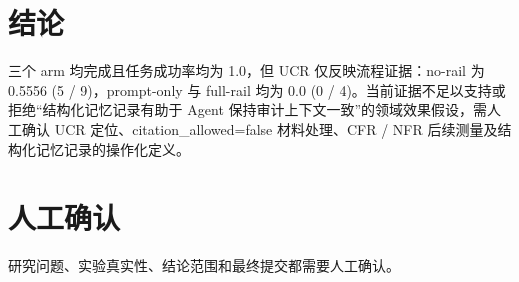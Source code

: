 \documentclass[UTF8]{ctexart}
\begin{document}
\section{结论}
三个 arm 均完成且任务成功率均为 1.0，但 UCR 仅反映流程证据：no-\allowbreak{}rail 为 0.5556 (5 / 9)，prompt-\allowbreak{}only 与 full-\allowbreak{}rail 均为 0.0 (0 / 4)。当前证据不足以支持或拒绝“结构化记忆记录有助于 Agent 保持审计上下文一致”的领域效果假设，需人工确认 UCR 定位、citation\_\allowbreak{}allowed=false 材料处理、CFR / NFR 后续测量及结构化记忆记录的操作化定义。
\section{人工确认}
研究问题、实验真实性、结论范围和最终提交都需要人工确认。
\end{document}
